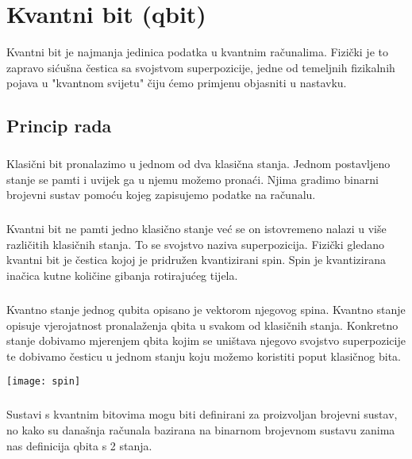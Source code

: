 \documentclass[times, utf8, zavrsni]{fer}
\begin{document}
\newpage

\chapter{Kvantni bit (qbit)}
Kvantni bit je najmanja jedinica podatka u kvantnim računalima. Fizički je to zapravo sićušna čestica sa svojstvom superpozicije, jedne od temeljnih fizikalnih pojava u "kvantnom svijetu" čiju ćemo primjenu objasniti u nastavku.

\section{Princip rada}
\paragraph{}
Klasični bit pronalazimo u jednom od dva klasična stanja. Jednom postavljeno stanje se pamti i uvijek ga u njemu možemo pronaći. Njima gradimo binarni brojevni sustav pomoću kojeg zapisujemo podatke na računalu.

\paragraph{}
Kvantni bit ne pamti jedno klasično stanje već se on istovremeno nalazi u više različitih klasičnih stanja. To se svojstvo naziva superpozicija. Fizički gledano kvantni bit je čestica kojoj je pridružen kvantizirani spin. Spin je kvantizirana inačica kutne količine gibanja rotirajućeg tijela.

\paragraph{}
Kvantno stanje jednog qubita opisano je vektorom njegovog spina. Kvantno stanje opisuje vjerojatnost pronalaženja qbita u svakom od klasičnih stanja. Konkretno stanje dobivamo mjerenjem qbita kojim se uništava njegovo svojstvo superpozicije te dobivamo česticu u jednom stanju koju možemo koristiti poput klasičnog bita.

\begin{center}
\texttt{[image: spin]}
\end{center}

\paragraph{}
Sustavi s kvantnim bitovima mogu biti definirani za proizvoljan brojevni sustav, no kako su današnja računala bazirana na binarnom brojevnom sustavu zanima nas definicija qbita s 2 stanja.
\end{document}

